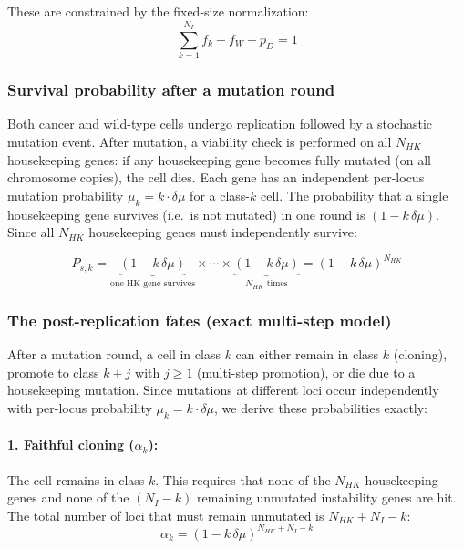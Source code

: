 \documentclass[11pt,a4paper]{article}
\begin{document}
These are constrained by the fixed-size normalization:
\begin{equation}
    \sum_{k=1}^{N_I} f_k + f_W + p_D = 1
\end{equation}

\subsubsection*{Survival probability after a mutation round}

Both cancer and wild-type cells undergo replication followed by a stochastic mutation event. After mutation, a viability check is performed on all $N_{HK}$ housekeeping genes: if any housekeeping gene becomes fully mutated (on all chromosome copies), the cell dies. Each gene has an independent per-locus mutation probability $\mu_k = k \cdot \delta\mu$ for a class-$k$ cell. The probability that a single housekeeping gene survives (i.e.\ is not mutated) in one round is $(1 - k\,\delta\mu)$. Since all $N_{HK}$ housekeeping genes must independently survive:

\begin{equation}
    P_{s,k} = \underbrace{(1 - k\,\delta\mu)}_{\text{one HK gene survives}} \times \cdots \times \underbrace{(1 - k\,\delta\mu)}_{N_{HK}\text{ times}} = (1 - k\,\delta\mu)^{N_{HK}}
\end{equation}

\subsubsection*{The post-replication fates (exact multi-step model)}

After a mutation round, a cell in class $k$ can either remain in class $k$ (cloning), promote to class $k+j$ with $j \ge 1$ (multi-step promotion), or die due to a housekeeping mutation. Since mutations at different loci occur independently with per-locus probability $\mu_k = k \cdot \delta\mu$, we derive these probabilities exactly:

\paragraph{1. Faithful cloning ($\alpha_k$):} The cell remains in class $k$. This requires that none of the $N_{HK}$ housekeeping genes and none of the $(N_I - k)$ remaining unmutated instability genes are hit. The total number of loci that must remain unmutated is $N_{HK} + N_I - k$:
\begin{equation}
    \alpha_k = (1 - k\,\delta\mu)^{N_{HK} + N_I - k}
\end{equation}
\end{document}
